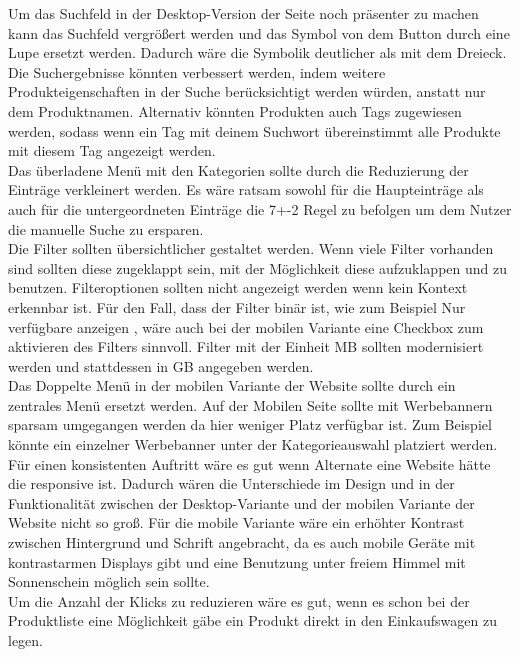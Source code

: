 \documentclass[	12pt, 
				a4paper, 
				BCOR=10mm, %
				DIV=12, 
				parskip=half, %
				headings=small, %
				twoside, %
				ngerman,
				bibliography=totoc,index=totoc, listof=totoc,
				numbers=noendperiod
				]{scrbook} %
\theoremstyle{plain}%
\theoremstyle{definition}
\theoremstyle{remark}
\begin{document}
Um das Suchfeld in der Desktop-Version der Seite noch präsenter zu machen kann das Suchfeld vergrößert werden und das Symbol von dem Button durch eine Lupe ersetzt werden. Dadurch wäre die Symbolik deutlicher als mit dem Dreieck.
Die Suchergebnisse könnten verbessert werden, indem weitere Produkteigenschaften in der Suche berücksichtigt werden würden, anstatt nur dem Produktnamen. Alternativ könnten Produkten auch Tags zugewiesen werden, sodass wenn ein Tag mit deinem Suchwort übereinstimmt alle Produkte mit diesem Tag angezeigt werden.\\
Das überladene Menü mit den Kategorien sollte durch die Reduzierung der Einträge verkleinert werden. Es wäre ratsam sowohl für die Haupteinträge als auch für die untergeordneten Einträge die 7+-2 Regel zu befolgen um dem Nutzer die manuelle Suche zu ersparen.\\
Die Filter sollten übersichtlicher gestaltet werden. Wenn viele Filter vorhanden sind sollten diese zugeklappt sein, mit der Möglichkeit diese aufzuklappen und zu benutzen. Filteroptionen sollten nicht angezeigt werden wenn kein Kontext erkennbar ist. Für den Fall, dass der Filter binär ist, wie zum Beispiel \glqq Nur verfügbare anzeigen\grqq{} , wäre auch bei der mobilen Variante eine Checkbox zum aktivieren des Filters sinnvoll.
Filter mit der Einheit MB sollten modernisiert werden und stattdessen in GB angegeben werden.\\
Das Doppelte Menü in der mobilen Variante der Website sollte durch ein zentrales Menü ersetzt werden. Auf der Mobilen Seite sollte mit Werbebannern sparsam umgegangen werden da hier weniger Platz verfügbar ist. Zum Beispiel könnte ein einzelner Werbebanner unter der Kategorieauswahl platziert werden.
Für einen konsistenten Auftritt wäre es gut wenn Alternate eine Website hätte die responsive ist. Dadurch wären die Unterschiede im Design und in der Funktionalität zwischen der Desktop-Variante und der mobilen Variante der Website nicht so groß. Für die mobile Variante wäre ein erhöhter Kontrast zwischen Hintergrund und Schrift angebracht, da es auch mobile Geräte mit kontrastarmen Displays gibt und eine Benutzung unter freiem Himmel mit Sonnenschein möglich sein sollte.\\
Um die Anzahl der Klicks zu reduzieren wäre es gut, wenn es schon bei der Produktliste eine Möglichkeit gäbe ein Produkt direkt in den Einkaufswagen zu legen.
\end{document}

